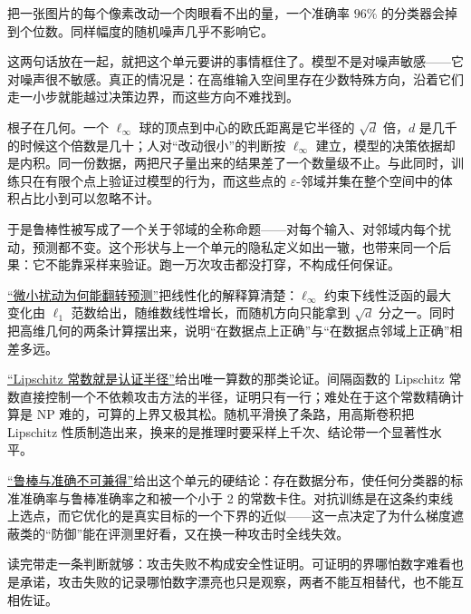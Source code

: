 把一张图片的每个像素改动一个肉眼看不出的量，一个准确率 \(96\%\) 的分类器会掉到个位数。同样幅度的随机噪声几乎不影响它。

这两句话放在一起，就把这个单元要讲的事情框住了。模型不是对噪声敏感——它对噪声很不敏感。真正的情况是：在高维输入空间里存在少数特殊方向，沿着它们走一小步就能越过决策边界，而这些方向不难找到。

根子在几何。一个 \(\ell_\infty\) 球的顶点到中心的欧氏距离是它半径的 \(\sqrt d\) 倍，\(d\) 是几千的时候这个倍数是几十；人对``改动很小''的判断按 \(\ell_\infty\) 建立，模型的决策依据却是内积。同一份数据，两把尺子量出来的结果差了一个数量级不止。与此同时，训练只在有限个点上验证过模型的行为，而这些点的 \(\varepsilon\)-邻域并集在整个空间中的体积占比小到可以忽略不计。

于是鲁棒性被写成了一个关于邻域的全称命题——对每个输入、对邻域内每个扰动，预测都不变。这个形状与上一个单元的隐私定义如出一辙，也带来同一个后果：它不能靠采样来验证。跑一万次攻击都没打穿，不构成任何保证。

\hyperref[sec:17-Constrained-Guarantees/02-Adversarial-Robustness/01]{``微小扰动为何能翻转预测''}把线性化的解释算清楚：\(\ell_\infty\) 约束下线性泛函的最大变化由 \(\ell_1\) 范数给出，随维数线性增长，而随机方向只能拿到 \(\sqrt d\) 分之一。同时把高维几何的两条计算摆出来，说明``在数据点上正确''与``在数据点邻域上正确''相差多远。

\hyperref[sec:17-Constrained-Guarantees/02-Adversarial-Robustness/02]{``Lipschitz 常数就是认证半径''}给出唯一算数的那类论证。间隔函数的 Lipschitz 常数直接控制一个不依赖攻击方法的半径，证明只有一行；难处在于这个常数精确计算是 NP 难的，可算的上界又极其松。随机平滑换了条路，用高斯卷积把 Lipschitz 性质制造出来，换来的是推理时要采样上千次、结论带一个显著性水平。

\hyperref[sec:17-Constrained-Guarantees/02-Adversarial-Robustness/03]{``鲁棒与准确不可兼得''}给出这个单元的硬结论：存在数据分布，使任何分类器的标准准确率与鲁棒准确率之和被一个小于 2 的常数卡住。对抗训练是在这条约束线上选点，而它优化的是真实目标的一个下界的近似——这一点决定了为什么梯度遮蔽类的``防御''能在评测里好看，又在换一种攻击时全线失效。

读完带走一条判断就够：攻击失败不构成安全性证明。可证明的界哪怕数字难看也是承诺，攻击失败的记录哪怕数字漂亮也只是观察，两者不能互相替代，也不能互相佐证。
